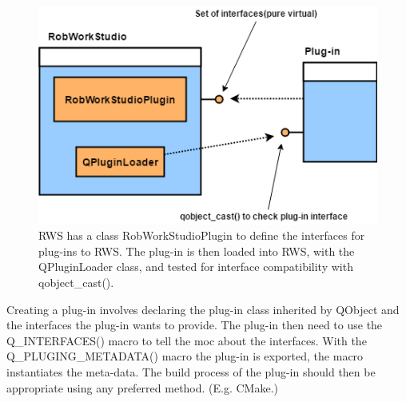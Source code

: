 \begin{figure}[h]
	\centering
	\includegraphics[scale=0.55]{Figures/pluginRWS.png}
	\caption{RWS has a class RobWorkStudioPlugin to define the interfaces for plug-ins to RWS. The plug-in is then loaded into RWS, with the QPluginLoader class, and tested for interface compatibility with qobject\_cast().}
	\label{fig:plugin}
\end{figure}

Creating a plug-in involves declaring the plug-in class inherited by QObject and the interfaces the plug-in wants to provide. The plug-in then need to use the Q\_INTERFACES() macro to tell the moc about the interfaces. With the Q\_PLUGING\_METADATA() macro the plug-in is exported, the macro instantiates the meta-data. The build process of the plug-in should then be appropriate using any preferred method. (E.g. CMake.)







